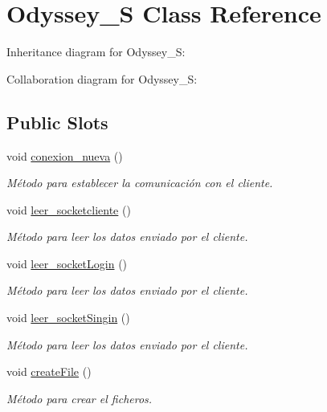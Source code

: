 \hypertarget{classOdyssey__S}{}\section{Odyssey\+\_\+S Class Reference}
\label{classOdyssey__S}


Inheritance diagram for Odyssey\+\_\+S\+:


Collaboration diagram for Odyssey\+\_\+S\+:
\subsection*{Public Slots}
\begin{DoxyCompactItemize}
\item 
void \hyperlink{classOdyssey__S_aeff37b01c182a1c89dfd219c659b23b0}{conexion\+\_\+nueva} ()
\begin{DoxyCompactList}\small\item\em Método para establecer la comunicación con el cliente. \end{DoxyCompactList}\item 
void \hyperlink{classOdyssey__S_a52f7c112ccabed8a33ebe6e71332ead3}{leer\+\_\+socketcliente} ()
\begin{DoxyCompactList}\small\item\em Método para leer los datos enviado por el cliente. \end{DoxyCompactList}\item 
void \hyperlink{classOdyssey__S_a94afe647c9124c63dec80c34c1971511}{leer\+\_\+socket\+Login} ()
\begin{DoxyCompactList}\small\item\em Método para leer los datos enviado por el cliente. \end{DoxyCompactList}\item 
void \hyperlink{classOdyssey__S_a0625b047b5b43f8760eeaa7c6fadeb44}{leer\+\_\+socket\+Singin} ()
\begin{DoxyCompactList}\small\item\em Método para leer los datos enviado por el cliente. \end{DoxyCompactList}\item 
void \hyperlink{classOdyssey__S_aab868c029c2d6cd24076e89694456162}{create\+File} ()\hypertarget{classOdyssey__S_aab868c029c2d6cd24076e89694456162}{}\label{classOdyssey__S_aab868c029c2d6cd24076e89694456162}

\begin{DoxyCompactList}\small\item\em Método para crear el ficheros. \end{DoxyCompactList}\end{DoxyCompactItemize}
